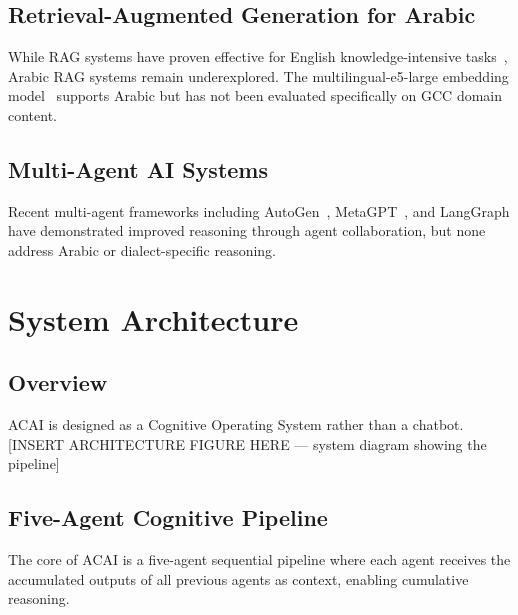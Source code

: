 \documentclass[11pt]{article}
\begin{document}
\subsection{Retrieval-Augmented Generation for Arabic}
While RAG systems have proven effective for English
knowledge-intensive tasks~\cite{lewis2020rag}, Arabic RAG systems
remain underexplored. The multilingual-e5-large embedding
model~\cite{wang2024} supports Arabic but has not been evaluated
specifically on GCC domain content.

\subsection{Multi-Agent AI Systems}
Recent multi-agent frameworks including AutoGen~\cite{wu2023},
MetaGPT~\cite{hong2023}, and LangGraph have demonstrated
improved reasoning through agent collaboration, but none address Arabic
or dialect-specific reasoning.

\section{System Architecture}

\subsection{Overview}
ACAI is designed as a Cognitive Operating System rather than a chatbot.
[INSERT ARCHITECTURE FIGURE HERE — system diagram showing the pipeline]

\subsection{Five-Agent Cognitive Pipeline}

The core of ACAI is a five-agent sequential pipeline where each agent
receives the accumulated outputs of all previous agents as context,
enabling cumulative reasoning.
\end{document}

